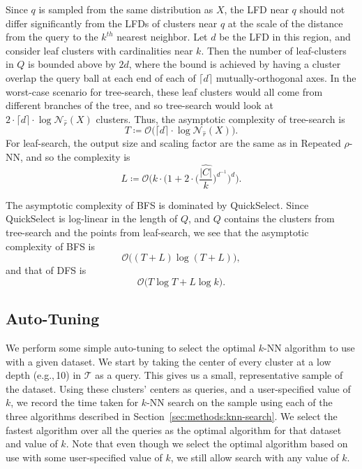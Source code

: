 Since $q$ is sampled from the same distribution as $X$, the LFD near $q$ should not differ significantly from the LFDs of clusters near $q$ at the scale of the distance from the query to the $k^{th}$ nearest neighbor.
Let $d$ be the LFD in this region, and consider leaf clusters with cardinalities near $k$.
Then the number of leaf-clusters in $Q$ is bounded above by $2d$, where the bound is achieved by having a cluster overlap the query ball at each end of each of $\lceil d \rceil$ mutually-orthogonal axes.
In the worst-case scenario for tree-search, these leaf clusters would all come from different branches of the tree, and so tree-search would look at $2 \cdot \lceil d \rceil \cdot \log \mathcal{N}_{\hat{r}}(X)$ clusters.
Thus, the asymptotic complexity of tree-search is
\begin{equation*}
    T \coloneqq \mathcal{O} \big( \lceil d \rceil \cdot \log \mathcal{N}_{\hat{r}}(X) \big).
\end{equation*}
For leaf-search, the output size and scaling factor are the same as in Repeated $\rho$-NN, and so the complexity is
\begin{equation*}
    L \coloneqq \mathcal{O} \Big( k \cdot \Big( 1 + 2 \cdot \big( \frac{\hat{|C|}}{k} \big) ^ {d^{-1}} \Big)^d \Big).
\end{equation*}

The asymptotic complexity of BFS is dominated by QuickSelect.
Since QuickSelect is log-linear in the length of $Q$, and $Q$ contains the clusters from tree-search and the points from leaf-search, we see that the asymptotic complexity of BFS is
\begin{equation}
    \mathcal{O} \big( (T + L ) \log (T + L ) \big),
    \label{eq:methods:bfs-complexity}
\end{equation}
and that of DFS is
\begin{equation}
    \mathcal{O} \big( T \log T + L \log k \big).
    \label{eq:methods:dfs-complexity}
\end{equation}

\subsection{Auto-Tuning}
\label{sec:methods:auto-tuning}

We perform some simple auto-tuning to select the optimal $k$-NN algorithm to use with a given dataset.
We start by taking the center of every cluster at a low depth (e.g.,\,10) in $\mathcal{T}$ as a query.
This gives us a small, representative sample of the dataset.
Using these clusters' centers as queries, and a user-specified value of $k$, we record the time taken for $k$-NN search on the sample using each of the three algorithms described in Section~\ref{sec:methods:knn-search}.
We select the fastest algorithm over all the queries as the optimal algorithm for that dataset and value of $k$.
Note that even though we select the optimal algorithm based on use with some user-specified value of $k$, we still allow search with any value of $k$.


